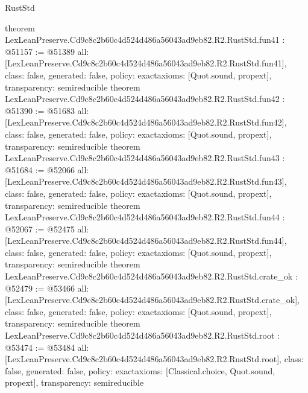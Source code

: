 \begin{lexlean}{RustStd}
\begin{coremodule}
{}
theorem LexLeanPreserve.Cd9c8c2b60c4d524d486a56043ad9eb82.R2.RustStd.fun41 : @51157 := @51389 {
  all: [LexLeanPreserve.Cd9c8c2b60c4d524d486a56043ad9eb82.R2.RustStd.fun41],
  class: false,
  generated: false,
  policy: exact{axioms: [Quot.sound, propext]},
  transparency: semireducible
}
theorem LexLeanPreserve.Cd9c8c2b60c4d524d486a56043ad9eb82.R2.RustStd.fun42 : @51390 := @51683 {
  all: [LexLeanPreserve.Cd9c8c2b60c4d524d486a56043ad9eb82.R2.RustStd.fun42],
  class: false,
  generated: false,
  policy: exact{axioms: [Quot.sound, propext]},
  transparency: semireducible
}
theorem LexLeanPreserve.Cd9c8c2b60c4d524d486a56043ad9eb82.R2.RustStd.fun43 : @51684 := @52066 {
  all: [LexLeanPreserve.Cd9c8c2b60c4d524d486a56043ad9eb82.R2.RustStd.fun43],
  class: false,
  generated: false,
  policy: exact{axioms: [Quot.sound, propext]},
  transparency: semireducible
}
theorem LexLeanPreserve.Cd9c8c2b60c4d524d486a56043ad9eb82.R2.RustStd.fun44 : @52067 := @52475 {
  all: [LexLeanPreserve.Cd9c8c2b60c4d524d486a56043ad9eb82.R2.RustStd.fun44],
  class: false,
  generated: false,
  policy: exact{axioms: [Quot.sound, propext]},
  transparency: semireducible
}
theorem LexLeanPreserve.Cd9c8c2b60c4d524d486a56043ad9eb82.R2.RustStd.crate_ok : @52479 := @53466 {
  all: [LexLeanPreserve.Cd9c8c2b60c4d524d486a56043ad9eb82.R2.RustStd.crate_ok],
  class: false,
  generated: false,
  policy: exact{axioms: [Quot.sound, propext]},
  transparency: semireducible
}
theorem LexLeanPreserve.Cd9c8c2b60c4d524d486a56043ad9eb82.R2.RustStd.root : @53474 := @53484 {
  all: [LexLeanPreserve.Cd9c8c2b60c4d524d486a56043ad9eb82.R2.RustStd.root],
  class: false,
  generated: false,
  policy: exact{axioms: [Classical.choice, Quot.sound, propext]},
  transparency: semireducible
}


\end{coremodule}
\end{lexlean}
